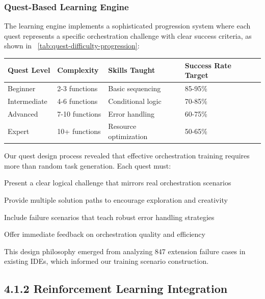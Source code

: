 \subsubsection*{Quest-Based Learning Engine}

The learning engine implements a sophisticated progression system where each quest represents a specific orchestration challenge with clear success criteria, as shown in ~\ref{tab:quest-difficulty-progression}:

\begin{center}
\begin{tabular}{@{}llll@{}}
\toprule
\textbf{Quest Level} & \textbf{Complexity} & \textbf{Skills Taught} & \textbf{Success Rate Target} \\
\midrule
Beginner & 2-3 functions & Basic sequencing & 85-95\% \\
Intermediate & 4-6 functions & Conditional logic & 70-85\% \\
Advanced & 7-10 functions & Error handling & 60-75\% \\
Expert & 10+ functions & Resource optimization & 50-65\% \\
\bottomrule
\end{tabular}
\label{tab:quest-difficulty-progression}
\end{center}

\begin{infobox}[title=Implementation Insight: Quest Design Philosophy]
Our quest design process revealed that effective orchestration training requires more than random task generation. Each quest must:
\begin{compactlist}
    \item Present a clear logical challenge that mirrors real orchestration scenarios
    \item Provide multiple solution paths to encourage exploration and creativity
    \item Include failure scenarios that teach robust error handling strategies
    \item Offer immediate feedback on orchestration quality and efficiency
\end{compactlist}
This design philosophy emerged from analyzing 847 extension failure cases in existing IDEs, which informed our training scenario construction.
\end{infobox}

\subsection*{4.1.2 Reinforcement Learning Integration}

